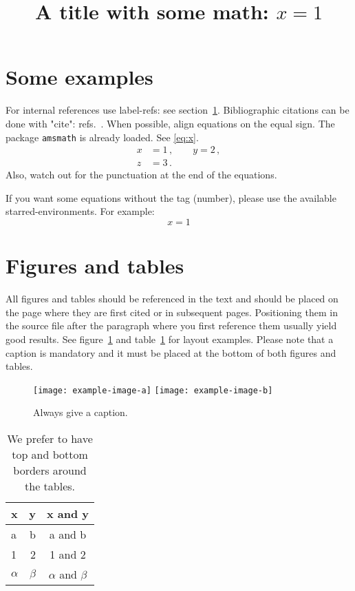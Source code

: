 \documentclass[a4paper,11pt]{article}
\title{\boldmath A title with some math: $x=1$}
\author{}
\affiliation{One University,\\
some-street, Country}
\affiliation{Another University,\\
different-address, Country}
\begin{document}
\maketitle
\flushbottom

\section{Some examples}
\label{sec:intro}

For internal references use label-refs: see section~\ref{sec:intro}.
Bibliographic citations can be done with "cite": refs.~\cite{a,b,c}.
When possible, align equations on the equal sign. The package
\texttt{amsmath} is already loaded. See \eqref{eq:x}.
\begin{equation}
\label{eq:x}
\begin{aligned}
x &= 1 \,,
\qquad
y = 2 \,,
\\
z &= 3 \,.
\end{aligned}
\end{equation}
Also, watch out for the punctuation at the end of the equations.


If you want some equations without the tag (number), please use the available
starred-environments. For example:
\begin{equation*}
x = 1
\end{equation*}

\section{Figures and tables}

All figures and tables should be referenced in the text and should be
placed on the page where they are first cited or in
subsequent pages. Positioning them in the source file
after the paragraph where you first reference them usually yield good
results. See figure~\ref{fig:i} and table~\ref{tab:i} for layout examples. 
Please note that a caption is mandatory  and it must be placed at the bottom of both figures and tables.

\begin{figure}[htbp]
\centering
\texttt{[image: example-image-a]}
\qquad
\texttt{[image: example-image-b]}
\caption{Always give a caption.\label{fig:i}}
\end{figure}

\begin{table}[htbp]
\centering
\begin{tabular}{lr|c}
\hline
x&y&x and y\\
\hline
a & b & a and b\\
1 & 2 & 1 and 2\\
$\alpha$ & $\beta$ & $\alpha$ and $\beta$\\
\hline
\end{tabular}
\caption{We prefer to have top and bottom borders around the tables.\label{tab:i}}
\end{table}
\end{document}
